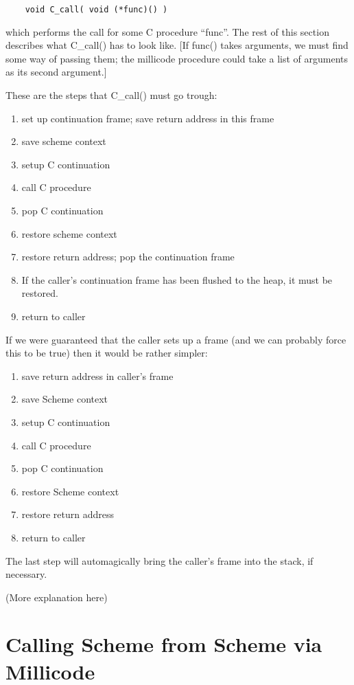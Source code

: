 \begin{verbatim}
    void C_call( void (*func)() )
\end{verbatim}

which performs the call for some C procedure ``func''. The rest of this
section describes what C\_call() has to look like. [If func() takes
arguments, we must find some way of passing them; the millicode
procedure could take a list of arguments as its second argument.]

These are the steps that C\_call() must go trough:

\begin{enumerate}
\item set up continuation frame; save return address in this frame
\item save scheme context
\item setup C continuation
\item call C procedure
\item pop C continuation
\item restore scheme context
\item restore return address; pop the continuation frame
\item If the caller's continuation frame has been flushed to the heap, it
   must be restored.
\item return to caller
\end{enumerate}

If we were guaranteed that the caller sets up a frame (and we can
probably force this to be true) then it would be rather simpler:

\begin{enumerate}
\item save return address in caller's frame
\item save Scheme context
\item setup C continuation
\item call C procedure
\item pop C continuation
\item restore Scheme context
\item restore return address
\item return to caller
\end{enumerate}

The last step will automagically bring the caller's frame into the
stack, if necessary.

(More explanation here)

\section{Calling Scheme from Scheme via Millicode}

